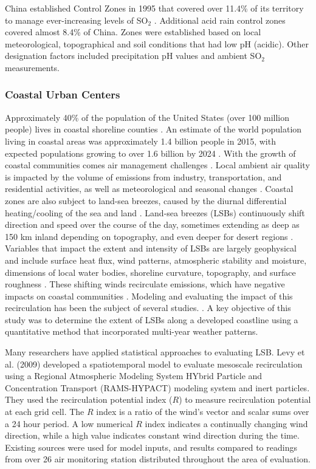 China established Control Zones in 1995 that covered over 11.4\% of its territory to manage ever-increasing levels of SO$_{2}$ \citep{Hao2000}.  Additional acid rain control zones covered almost 8.4\% of China.  Zones were established based on local meteorological, topographical and soil conditions that had low pH (acidic).  Other designation factors included precipitation pH values and ambient SO$_{2}$ measurements.

\subsubsection{Coastal Urban Centers}

Approximately 40\% of the population of the United States (over 100 million people) lives in coastal shoreline counties \citep{NOAA2013}.  An estimate of the world population living in coastal areas was approximately 1.4 billion people in 2015, with expected populations growing to over 1.6 billion by 2024 \citep{Geohive2015}.  With the growth of coastal communities comes air management challenges \citep{Gamas2015}.  Local ambient air quality is impacted by the volume of emissions from industry, transportation, and residential activities, as well as meteorological and seasonal changes \citep{Fiore2015, Kimbrough2013}.  Coastal zones are also subject to land-sea breezes, caused by the diurnal differential heating/cooling of the sea and land \citep{Crosman2010, Cuxart2014, Tsai2011}.  Land-sea breezes (LSBs) continuously shift direction and speed over the course of the day, sometimes extending as deep as 150 km inland depending on topography, and even deeper for desert regions \citep{Miao2015, Zhu2004}.  Variables that impact the extent and intensity of LSBs are largely geophysical and include surface heat flux, wind patterns, atmospheric stability and moisture, dimensions of local water bodies, shoreline curvature, topography, and surface roughness \citep{Crosman2010, Lu1995}.  These shifting winds recirculate emissions, which have negative impacts on coastal communities \citep{Lu1996}.  Modeling and evaluating the impact of this recirculation has been the subject of several studies. \citep{Crosman2010, Levy2009, Wu2013, Zhu2004}.  A key objective of this study was to determine the extent of LSBs along a developed coastline using a quantitative method that incorporated multi-year weather patterns. 

Many researchers have applied statistical approaches to evaluating LSB.  Levy et al. (2009) developed a spatiotemporal model to evaluate mesoscale recirculation using a Regional Atmospheric Modeling System HYbrid Particle and Concentration Transport (RAMS-HYPACT) modeling system and inert particles.  They used the recirculation potential index ($R$) to measure recirculation potential at each grid cell.  The $R$ index is a ratio of the wind’s vector and scalar sums over a 24 hour period.  A low numerical $R$ index indicates a continually changing wind direction, while a high value indicates constant wind direction during the time.  Existing sources were used for model inputs, and results compared to readings from over 26 air monitoring station distributed throughout the area of evaluation.  

